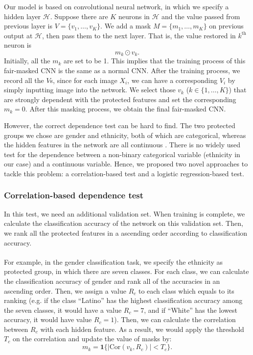 Our model is based on convolutional neural network, in which we specify a hidden layer $\mathcal{H}$. Suppose there are $K$ neurons in $\mathcal{H}$ and the value passed from previous layer is $V = \{v_1, \dots, v_K\}$. We add a mask $M = \{m_1, \dots, m_K\}$ on previous output at $\mathcal{H}$, then pass them to the next layer. That is, the value restored in $k^{\text{th}}$ neuron is 
$$
m_k \odot v_k.
$$
Initially, all the $m_k$ are set to be 1. This implies that the training process of this fair-masked CNN is the same as a normal CNN. After the training process, we record all the $V$s, since for each image $X_i$, we can have a corresponding $V_i$ by simply inputting image into the network. We select those $v_k$ ($k \in \{1, \dots, K\}$) that are strongly dependent with the protected features and set the corresponding $m_k = 0$. After this masking process, we obtain the final fair-masked CNN.

However, the correct dependence test can be hard to find. The two protected groups we chose are gender and ethnicity, both of which are categorical, whereas the hidden features in the network are all continuous . There is no widely used test for the dependence between a non-binary categorical variable (ethnicity in our case) and a continuous variable. Hence, we proposed two novel approaches to tackle this problem: a correlation-based test and a logistic regression-based test.

\subsubsection*{Correlation-based dependence test}
In this test, we need an additional validation set. When training is complete, we calculate the classification accuracy of the network on this validation set. Then, we rank all the protected features in a ascending order according to classification accuracy.
\\
\\
For example, in the gender classification task, we specify the ethnicity as protected group, in which there are seven classes. For each class, we can calculate the classification accuracy of gender and rank all of the accuracies in an ascending order. Then, we assign a value $R_c$ to each class which equals to its ranking (e.g. if the class ``Latino'' has the highest classification accuracy among the seven classes, it would have a value $R_c = 7$, and if ``White'' has the lowest accuracy, it would have value $R_c = 1$). Then, we can calculate the correlation between $R_c$ with each hidden feature. As a result, we would apply the threshold $T_c$ on the correlation and update the value of masks by:
\begin{equation}\label{correlation}
m_k = \mathbf{1}\{|\text{Cor}(v_k, R_c)| < T_c\}.
\end{equation}

